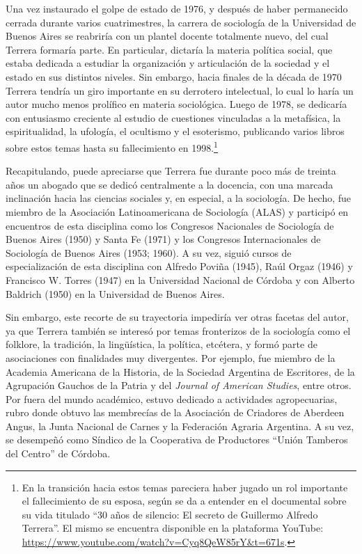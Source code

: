 Una vez instaurado el golpe de estado de 1976, y después de haber permanecido cerrada durante varios cuatrimestres, la carrera de sociología de la Universidad de Buenos Aires se reabriría con un plantel docente totalmente nuevo, del cual Terrera formaría parte. En particular, dictaría la materia política social, que estaba dedicada a estudiar la organización y articulación de la sociedad y el estado en sus distintos niveles. Sin embargo, hacia finales de la década de 1970 Terrera tendría un giro importante en su derrotero intelectual, lo cual lo haría un autor mucho menos prolífico en materia sociológica. Luego de 1978, se dedicaría con entusiasmo creciente al estudio de cuestiones vinculadas a la metafísica, la espiritualidad, la ufología, el ocultismo y el esoterismo, publicando varios libros sobre estos temas hasta su fallecimiento en 1998.\footnote{En la transición hacia estos temas pareciera haber jugado un rol importante el fallecimiento de su esposa, según se da a entender en el documental sobre su vida titulado ``30 años de silencio: El secreto de Guillermo Alfredo Terrera''. El mismo se encuentra disponible en la plataforma YouTube: \url{https://www.youtube.com/watch?v=Cyq8QeW85rY\&t=671s}.}

Recapitulando, puede apreciarse que Terrera fue durante poco más de treinta años un abogado que se dedicó centralmente a la docencia, con una marcada inclinación hacia las ciencias sociales y, en especial, a la sociología. De hecho, fue miembro de la Asociación Latinoamericana de Sociología (ALAS) y participó en encuentros de esta disciplina como los Congresos Nacionales de Sociología de Buenos Aires (1950) y Santa Fe (1971) y los Congresos Internacionales de Sociología de Buenos Aires (1953; 1960). A su vez, siguió cursos de especialización de esta disciplina con Alfredo Poviña (1945), Raúl Orgaz (1946) y Francisco W. Torres (1947) en la Universidad Nacional de Córdoba y con Alberto Baldrich (1950) en la Universidad de Buenos Aires.

Sin embargo, este recorte de su trayectoria impediría ver otras facetas del autor, ya que Terrera también se interesó por temas fronterizos de la sociología como el folklore, la tradición, la lingüística, la política, etcétera, y formó parte de asociaciones con finalidades muy divergentes. Por ejemplo, fue miembro de la Academia Americana de la Historia, de la Sociedad Argentina de Escritores, de la Agrupación Gauchos de la Patria y del \emph{Journal of American Studies}, entre otros. Por fuera del mundo académico, estuvo dedicado a actividades agropecuarias, rubro donde obtuvo las membrecías de la Asociación de Criadores de Aberdeen Angus, la Junta Nacional de Carnes y la Federación Agraria Argentina. A su vez, se desempeñó como Síndico de la Cooperativa de Productores ``Unión Tamberos del Centro'' de Córdoba.


